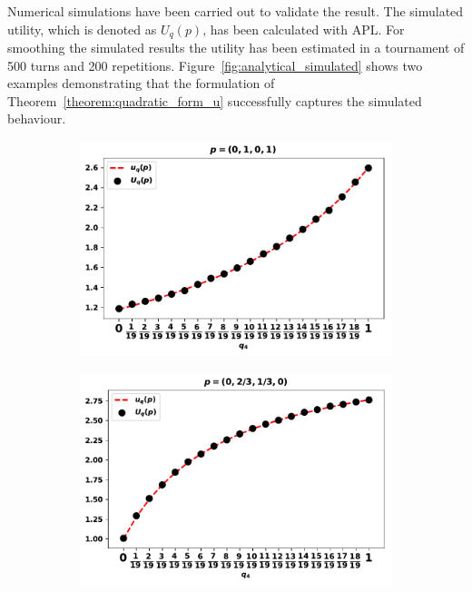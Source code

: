 

Numerical simulations have been carried out to validate the result. The simulated utility, which is
denoted as \(U_q(p)\), has been calculated with APL.
For smoothing the simulated results the utility
has been estimated in a tournament of 500 turns and 200 repetitions.
Figure~\ref{fig:analytical_simulated} shows two examples demonstrating that the
formulation of Theorem~\ref{theorem:quadratic_form_u} successfully captures the
simulated behaviour.

\begin{figure}[!htbp]
    \begin{center}
        \begin{subfigure}{0.5\textwidth}
            \includegraphics[width=\linewidth]{src/chapters/05/paper/memory-size-in-the-prisoners-dilemma/img/validation_against_player_one.pdf}
        \end{subfigure}
        \begin{subfigure}{0.5\textwidth}
            \includegraphics[width=\linewidth]{src/chapters/05/paper/memory-size-in-the-prisoners-dilemma/img/validation_against_player_two.pdf}

\end{subfigure}
\end{center}
\end{figure}
